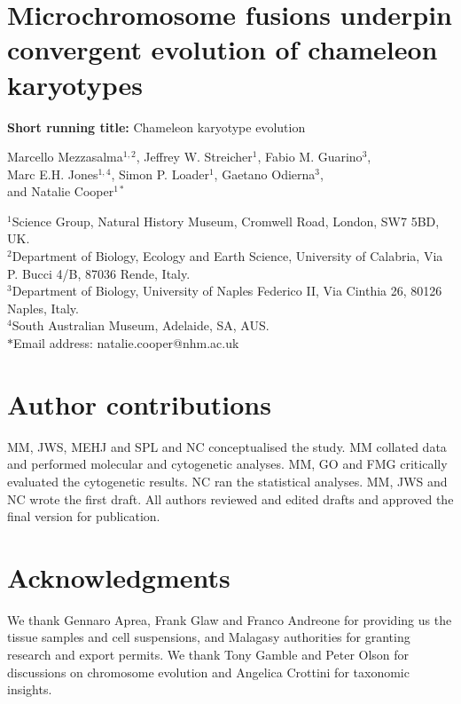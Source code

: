 \documentclass[a4paper, 12pt]{article}
\begin{document}

\section*{Microchromosome fusions underpin convergent evolution of chameleon karyotypes}

\textbf{Short running title:} Chameleon karyotype evolution\\

\begin{centering}

Marcello Mezzasalma$^{1,2}$, 
Jeffrey W. Streicher$^{1}$, 
Fabio M. Guarino$^{3}$,\\ 
Marc E.H. Jones$^{1,4}$, 
Simon P. Loader$^{1}$, 
Gaetano Odierna$^{3}$,\\ 
and Natalie Cooper$^{1*}$

\end{centering}

  $^1$Science Group, Natural History Museum, Cromwell Road, London, SW7 5BD, UK.\\
  $^2$Department of Biology, Ecology and Earth Science, University of Calabria, Via P. Bucci 4/B, 87036 Rende, Italy.\\
  $^3$Department of Biology, University of Naples Federico II, Via Cinthia 26, 80126 Naples, Italy.\\
  $^4$South Australian Museum, Adelaide, SA, AUS.\\
  $*$Email address: natalie.cooper@nhm.ac.uk\\


\section*{Author contributions}
MM, JWS, MEHJ and SPL and NC conceptualised the study. MM collated data and performed molecular and cytogenetic analyses. MM, GO and FMG critically evaluated the cytogenetic results. NC ran the statistical analyses. MM, JWS and NC wrote the first draft. All authors reviewed and edited drafts and approved the final version for publication.

\section*{Acknowledgments}
We thank Gennaro Aprea, Frank Glaw and Franco Andreone for providing us the tissue samples and cell suspensions, and Malagasy authorities for granting research and export permits. We thank Tony Gamble and Peter Olson for discussions on chromosome evolution and Angelica Crottini for taxonomic insights.
\end{document}
